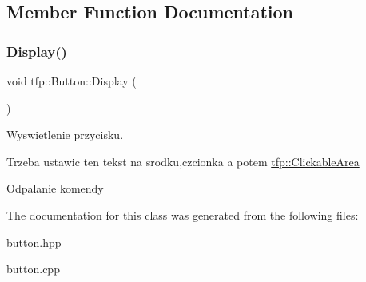 \subsection{Member Function Documentation}
\mbox{\label{classtfp_1_1_button_a6d939faf2c819275923bc088e371767f}} 
\subsubsection{\texorpdfstring{Display()}{Display()}}
{\footnotesize\ttfamily void tfp\+::\+Button\+::\+Display (\begin{DoxyParamCaption}{ }\end{DoxyParamCaption})}



Wyswietlenie przycisku. 

Trzeba ustawic ten tekst na srodku,czcionka a potem \mbox{\hyperlink{classtfp_1_1_clickable_area}{tfp\+::\+Clickable\+Area}}

Odpalanie komendy 

The documentation for this class was generated from the following files\+:\begin{DoxyCompactItemize}
\item 
button.\+hpp\item 
button.\+cpp\end{DoxyCompactItemize}

